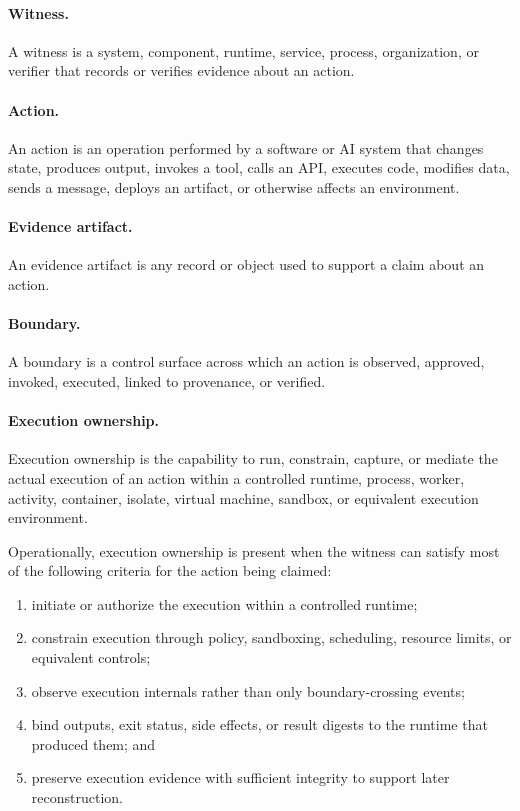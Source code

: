 \documentclass[11pt]{article}
\begin{document}
\paragraph{Witness.} A witness is a system, component, runtime, service, process, organization, or verifier that records or verifies evidence about an action.

\paragraph{Action.} An action is an operation performed by a software or AI system that changes state, produces output, invokes a tool, calls an API, executes code, modifies data, sends a message, deploys an artifact, or otherwise affects an environment.

\paragraph{Evidence artifact.} An evidence artifact is any record or object used to support a claim about an action.

\paragraph{Boundary.} A boundary is a control surface across which an action is observed, approved, invoked, executed, linked to provenance, or verified.

\paragraph{Execution ownership.} Execution ownership is the capability to run, constrain, capture, or mediate the actual execution of an action within a controlled runtime, process, worker, activity, container, isolate, virtual machine, sandbox, or equivalent execution environment.

Operationally, execution ownership is present when the witness can satisfy most of the following criteria for the action being claimed:
\begin{enumerate}[leftmargin=*]
\item initiate or authorize the execution within a controlled runtime;
\item constrain execution through policy, sandboxing, scheduling, resource limits, or equivalent controls;
\item observe execution internals rather than only boundary-crossing events;
\item bind outputs, exit status, side effects, or result digests to the runtime that produced them; and
\item preserve execution evidence with sufficient integrity to support later reconstruction.
\end{enumerate}
\end{document}

